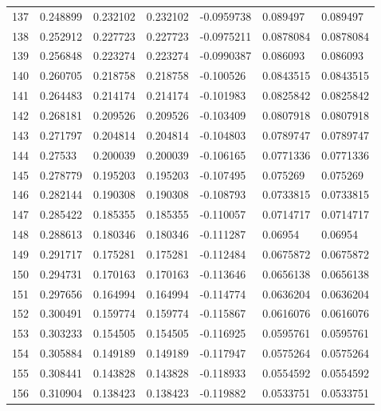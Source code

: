 \begin{longtable}{l|lll|lll}
 137 &  0.248899    & 0.232102    & 0.232102    & -0.0959738   & 0.089497    & 0.089497    \\
 138 &  0.252912    & 0.227723    & 0.227723    & -0.0975211   & 0.0878084   & 0.0878084   \\
 139 &  0.256848    & 0.223274    & 0.223274    & -0.0990387   & 0.086093    & 0.086093    \\
 140 &  0.260705    & 0.218758    & 0.218758    & -0.100526    & 0.0843515   & 0.0843515   \\
 141 &  0.264483    & 0.214174    & 0.214174    & -0.101983    & 0.0825842   & 0.0825842   \\
 142 &  0.268181    & 0.209526    & 0.209526    & -0.103409    & 0.0807918   & 0.0807918   \\
 143 &  0.271797    & 0.204814    & 0.204814    & -0.104803    & 0.0789747   & 0.0789747   \\
 144 &  0.27533     & 0.200039    & 0.200039    & -0.106165    & 0.0771336   & 0.0771336   \\
 145 &  0.278779    & 0.195203    & 0.195203    & -0.107495    & 0.075269    & 0.075269    \\
 146 &  0.282144    & 0.190308    & 0.190308    & -0.108793    & 0.0733815   & 0.0733815   \\
 147 &  0.285422    & 0.185355    & 0.185355    & -0.110057    & 0.0714717   & 0.0714717   \\
 148 &  0.288613    & 0.180346    & 0.180346    & -0.111287    & 0.06954     & 0.06954     \\
 149 &  0.291717    & 0.175281    & 0.175281    & -0.112484    & 0.0675872   & 0.0675872   \\
 150 &  0.294731    & 0.170163    & 0.170163    & -0.113646    & 0.0656138   & 0.0656138   \\
 151 &  0.297656    & 0.164994    & 0.164994    & -0.114774    & 0.0636204   & 0.0636204   \\
 152 &  0.300491    & 0.159774    & 0.159774    & -0.115867    & 0.0616076   & 0.0616076   \\
 153 &  0.303233    & 0.154505    & 0.154505    & -0.116925    & 0.0595761   & 0.0595761   \\
 154 &  0.305884    & 0.149189    & 0.149189    & -0.117947    & 0.0575264   & 0.0575264   \\
 155 &  0.308441    & 0.143828    & 0.143828    & -0.118933    & 0.0554592   & 0.0554592   \\
 156 &  0.310904    & 0.138423    & 0.138423    & -0.119882    & 0.0533751   & 0.0533751   \\

\end{longtable}
